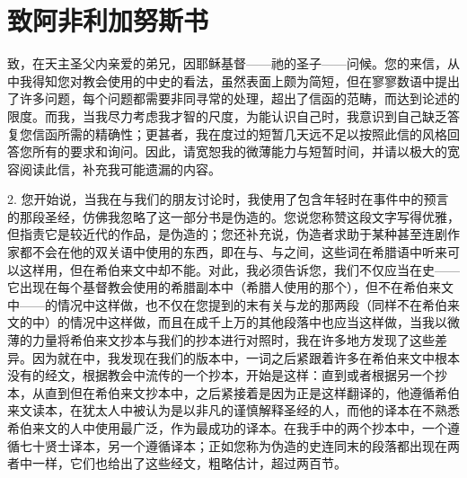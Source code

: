 
\chapter{致阿非利加努斯书}


致，在天主圣父内亲爱的弟兄，因耶稣基督——祂的圣子——问候。您的来信，从中我得知您对教会使用的中史的看法，虽然表面上颇为简短，但在寥寥数语中提出了许多问题，每个问题都需要非同寻常的处理，超出了信函的范畴，而达到论述的限度。而我，当我尽力考虑我才智的尺度，为能认识自己时，我意识到自己缺乏答复您信函所需的精确性；更甚者，我在度过的短暂几天远不足以按照此信的风格回答您所有的要求和询问。因此，请宽恕我的微薄能力与短暂时间，并请以极大的宽容阅读此信，补充我可能遗漏的内容。\par

2. 您开始说，当我在与我们的朋友讨论时，我使用了包含年轻时在事件中的预言的那段圣经，仿佛我忽略了这一部分书是伪造的。您说您称赞这段文字写得优雅，但指责它是较近代的作品，是伪造的；您还补充说，伪造者求助于某种甚至连剧作家都不会在他的双关语中使用的东西，即在与、与之间，这些词在希腊语中听来可以这样用，但在希伯来文中却不能。对此，我必须告诉您，我们不仅应当在史——它出现在每个基督教会使用的希腊副本中（希腊人使用的那个），但不在希伯来文中——的情况中这样做，也不仅在您提到的末有关与龙的那两段（同样不在希伯来文的中）的情况中这样做，而且在成千上万的其他段落中也应当这样做，当我以微薄的力量将希伯来文抄本与我们的抄本进行对照时，我在许多地方发现了这些差异。因为就在中，我发现在我们的版本中，一词之后紧跟着许多在希伯来文中根本没有的经文，根据教会中流传的一个抄本，开始是这样：直到或者根据另一个抄本，从直到但在希伯来文抄本中，之后紧接着是因为正是这样翻译的，他遵循希伯来文读本，在犹太人中被认为是以非凡的谨慎解释圣经的人，而他的译本在不熟悉希伯来文的人中使用最广泛，作为最成功的译本。在我手中的两个抄本中，一个遵循七十贤士译本，另一个遵循译本；正如您称为伪造的史连同末的段落都出现在两者中一样，它们也给出了这些经文，粗略估计，超过两百节。\par

